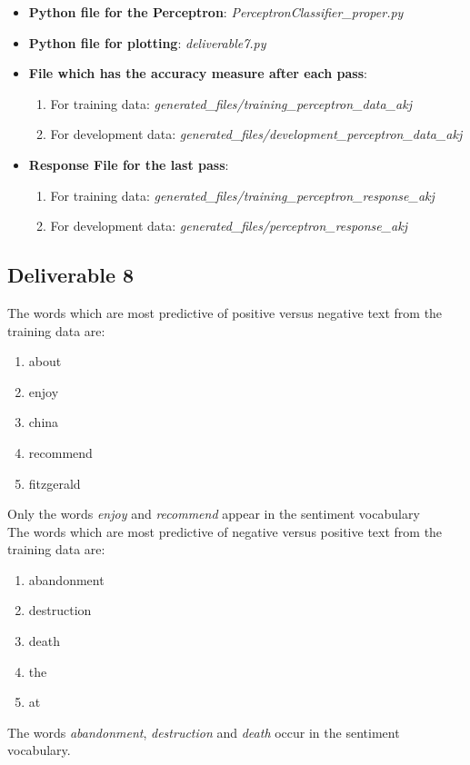 \documentclass[10pt, letter]{article}
\begin{document}
\begin{itemize}
	\item \textbf{Python file for the Perceptron}: \textit{PerceptronClassifier\_proper.py}
	\item \textbf{Python file for plotting}: \textit{deliverable7.py}
	\item \textbf{File which has the accuracy measure after each pass}: 
		\begin{enumerate}
			\item For training data: \textit{generated\_files/training\_perceptron\_data\_akj}
			\item For development data: \textit{generated\_files/development\_perceptron\_data\_akj}
		\end{enumerate}
	\item \textbf{Response File for the last pass}: 
	\begin{enumerate}
			\item For training data: \textit{generated\_files/training\_perceptron\_response\_akj}
			\item For development data: \textit{generated\_files/perceptron\_response\_akj}
		\end{enumerate}
\end{itemize}

\subsection*{Deliverable 8}
The words which are most predictive of positive versus negative text from the training data are:
\begin{enumerate}
	\item about
	\item enjoy	
	\item china	
	\item recommend
	\item fitzgerald
\end{enumerate}
Only the words \textit{enjoy} and \textit{recommend} appear in the sentiment vocabulary\\
The words which are most predictive of negative versus positive text from the training data are:
\begin{enumerate}
	\item abandonment
	\item destruction
	\item death
	\item the
	\item at
\end{enumerate}
The words \textit{abandonment}, \textit{destruction} and \textit{death} occur in the sentiment vocabulary. 
\end{document}
